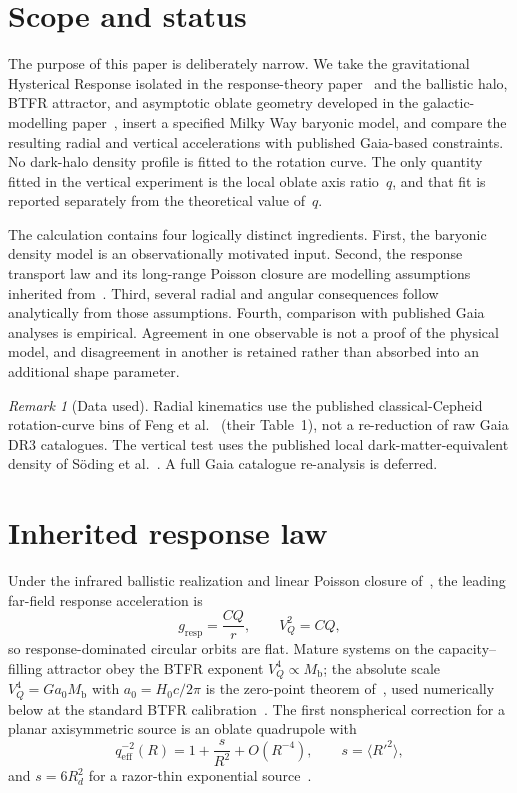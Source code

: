 \documentclass[11pt]{article}
\theoremstyle{definition}
\theoremstyle{remark}
\newtheorem{remark}[theorem]{Remark}
\newcommand{\Mb}{M_{\mathrm{b}}}
\newcommand{\qeff}{q_{\mathrm{eff}}}
\begin{document}
\section{Scope and status}
\label{sec:scope}
The purpose of this paper is deliberately narrow.
We take the gravitational Hysterical Response isolated in the response-theory paper~\cite{boyd2026response} and the ballistic halo, BTFR attractor, and asymptotic oblate geometry developed in the galactic-modelling paper~\cite{boyd2026galactic}, insert a specified Milky Way baryonic model, and compare the resulting radial and vertical accelerations with published Gaia-based constraints.
No dark-halo density profile is fitted to the rotation curve.
The only quantity fitted in the vertical experiment is the local oblate axis ratio~$q$, and that fit is reported separately from the theoretical value of~$q$.

The calculation contains four logically distinct ingredients.
First, the baryonic density model is an observationally motivated input.
Second, the response transport law and its long-range Poisson closure are modelling assumptions inherited from~\cite{boyd2026galactic}.
Third, several radial and angular consequences follow analytically from those assumptions.
Fourth, comparison with published Gaia analyses is empirical.
Agreement in one observable is not a proof of the physical model, and disagreement in another is retained rather than absorbed into an additional shape parameter.

\begin{remark}[Data used]
\label{rem:data}
Radial kinematics use the published classical-Cepheid rotation-curve bins of Feng et al.~\cite{Feng2026} (their Table~1), not a re-reduction of raw Gaia DR3 catalogues.
The vertical test uses the published local dark-matter-equivalent density of S\"oding et al.~\cite{Soding2025}.
A full Gaia catalogue re-analysis is deferred.
\end{remark}

\section{Inherited response law}
\label{sec:inherited}
Under the infrared ballistic realization and linear Poisson closure of~\cite{boyd2026galactic}, the leading far-field response acceleration is
\begin{equation}
  g_{\mathrm{resp}}=\frac{CQ}{r},
  \qquad V_Q^{2}=CQ,
\end{equation}
so response-dominated circular orbits are flat.
Mature systems on the capacity--filling attractor obey the BTFR exponent $V_Q^{4}\propto\Mb$; the absolute scale $V_Q^{4}=Ga_0\Mb$ with $a_0=H_0c/2\pi$ is the zero-point theorem of~\cite{boyd2026galactic}, used numerically below at the standard BTFR calibration~\cite{mcgaugh2012,lelli2016}.
The first nonspherical correction for a planar axisymmetric source is an oblate quadrupole with
\begin{equation}
  \qeff^{-2}(R)=1+\frac{s}{R^{2}}+O(R^{-4}),
  \qquad s=\langle R'^{2}\rangle,
\end{equation}
and $s=6R_d^{2}$ for a razor-thin exponential source~\cite{boyd2026galactic}.
\end{document}
